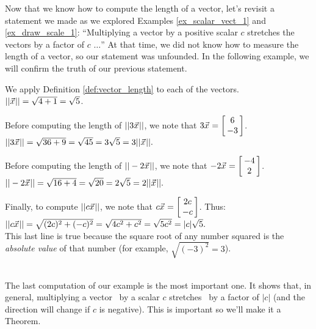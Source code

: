 Now that we know how to compute the length of a vector, let's revisit a statement we made as we explored Examples \ref{ex_scalar_vect_1} and \ref{ex_draw_scale_1}: ``Multiplying a vector by a positive scalar $c$ stretches the vectors by a factor of $c$ $\ldots$'' At that time, we did not know how to measure the length of a vector, so our statement was unfounded. In the following example, we will confirm the truth of our previous statement.\\

{We apply Definition \ref{def:vector_length} to each of the vectors.\\

$||\vx|| = \sqrt{4+1} = \sqrt{5}$.

Before computing the length of $||3\vx||$, we note that $3\vx = \bmx{c} 6\\-3\emx$.\\

$||3\vx|| = \sqrt{36+9} = \sqrt{45} = 3\sqrt{5} = 3||\vx||.$

Before computing the length of $||-2\vx||$, we note that $-2\vx = \bmx{c} -4\\2\emx$.\\

$||-2\vx|| = \sqrt{16+4} = \sqrt{20} = 2\sqrt{5} = 2||\vx||.$

Finally, to compute $||c\vx||$, we note that $c\vx = \bmx{c} 2c\\-c\emx$. Thus:\\

$||c\vx|| = \sqrt{(2c)^2 + (-c)^2} = \sqrt{4c^2 + c^2} = \sqrt{5c^2} = |c|\sqrt{5}.$\\

This last line is true because the square root of any number squared is the \textit{absolute value} of that number (for example, $\sqrt{(-3)^2} = 3$).}\\%

The last computation of our example is the most important one. It shows that, in general, multiplying a vector \vx\ by a scalar $c$ stretches \vx\ by a factor of $|c|$ (and the direction will change if $c$ is negative). This is important so we'll make it a Theorem.


